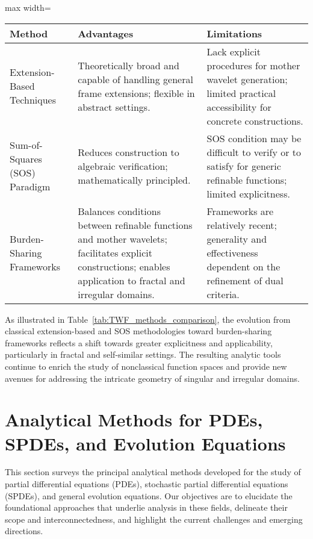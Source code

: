 \documentclass[sigconf]{acmart}
\begin{document}
\begin{table*}[htbp]
\centering
\caption{Comparison of Construction Methods for Tight Wavelet Frames (TWFs)}
\label{tab:TWF_methods_comparison}
\begin{adjustbox}{max width=\textwidth}
\begin{tabular}{lll}
\toprule
\textbf{Method} & \textbf{Advantages} & \textbf{Limitations} \\
\midrule
Extension-Based Techniques & Theoretically broad and capable of handling general frame extensions; flexible in abstract settings. & Lack explicit procedures for mother wavelet generation; limited practical accessibility for concrete constructions. \\
Sum-of-Squares (SOS) Paradigm & Reduces construction to algebraic verification; mathematically principled. & SOS condition may be difficult to verify or to satisfy for generic refinable functions; limited explicitness. \\
Burden-Sharing Frameworks & Balances conditions between refinable functions and mother wavelets; facilitates explicit constructions; enables application to fractal and irregular domains. & Frameworks are relatively recent; generality and effectiveness dependent on the refinement of dual criteria. \\
\bottomrule
\end{tabular}
\end{adjustbox}
\end{table*}

As illustrated in Table~\ref{tab:TWF_methods_comparison}, the evolution from classical extension-based and SOS methodologies toward burden-sharing frameworks reflects a shift towards greater explicitness and applicability, particularly in fractal and self-similar settings. The resulting analytic tools continue to enrich the study of nonclassical function spaces and provide new avenues for addressing the intricate geometry of singular and irregular domains.

\section{Analytical Methods for PDEs, SPDEs, and Evolution Equations}

This section surveys the principal analytical methods developed for the study of partial differential equations (PDEs), stochastic partial differential equations (SPDEs), and general evolution equations. Our objectives are to elucidate the foundational approaches that underlie analysis in these fields, delineate their scope and interconnectedness, and highlight the current challenges and emerging directions.
\end{document}
